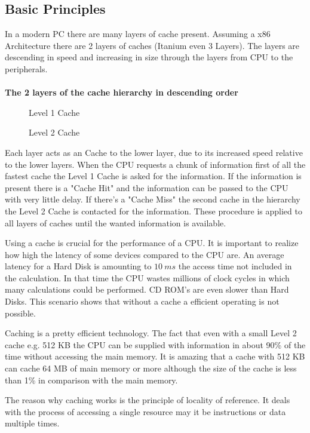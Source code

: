 \documentclass[DIV10, abstracton, openright, footsepline, headsepline, twoside, 9pt,
bigheadings]{scrreprt}
\begin{document}
\subsection{Basic Principles}
In a modern PC there are many layers of cache
present. Assuming a x86 Architecture there are 2 layers of caches (Itanium even
3 Layers). The layers are descending in speed and increasing in size through the
layers from CPU to the peripherals. \\\\
\textbf{The 2 layers of the cache hierarchy in descending order}
\begin{description}
\item[\color{Bigblue}{$\triangleright$}] Level 1 Cache
\item[\color{Bigblue}{$\triangleright$}] Level 2 Cache
\end{description}
Each layer acts as an Cache to the lower layer, due to its increased speed
relative to the lower layers. When the CPU requests a chunk of information
first of all the fastest cache the Level 1 Cache is asked for the information.
If the information is present there is a "Cache Hit" and the information can be
passed to the CPU with very little delay. If there's a "Cache Miss" the second
 cache in  the hierarchy the Level 2 Cache is contacted for the information.
These procedure is applied to all layers of caches until the wanted information
is available.

Using a cache is crucial for the performance of a CPU. It is important to
realize how high the latency of some devices compared to the CPU are. An average
latency for a Hard Disk is amounting to $10\ ms$ the access time not included in
the calculation. In that time the CPU wastes millions of clock cycles in which
many calculations could be performed. CD ROM's are even slower than Hard Disks.
This scenario shows that without a cache a efficient operating is not possible.

Caching is a pretty efficient technology. The fact that even with a
small Level 2 cache e.g. 512 KB the CPU can be supplied with information in
about 90\% of the time without accessing the main memory. It is amazing that a
cache with 512 KB can cache 64 MB of main memory or more although the size of
the cache is less than 1\% in comparison with the main memory.

The reason why caching works is the principle of locality of reference. It deals
with the process of accessing a single resource may it be instructions or data
multiple times.
\end{document}
